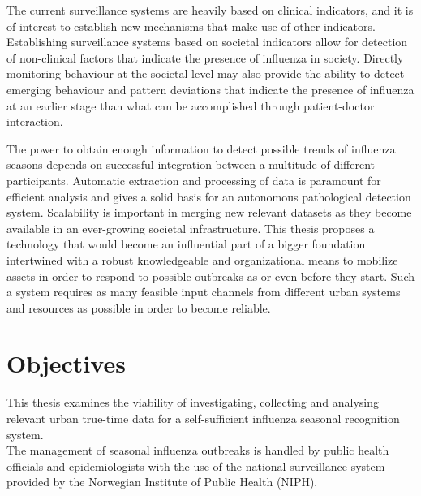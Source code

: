 The current surveillance systems are heavily based on clinical indicators, and it is of interest to establish new mechanisms that make use of other indicators. Establishing surveillance systems based on societal indicators allow for detection of non-clinical factors that indicate the presence of influenza in society. Directly monitoring behaviour at the societal level may also provide the ability to detect emerging behaviour and pattern deviations that indicate the presence of influenza at an earlier stage than what can be accomplished through patient-doctor interaction.

 The power to obtain enough information to detect possible trends of influenza seasons depends on successful integration between a multitude of different participants. Automatic extraction and processing of data is paramount for efficient analysis and gives a solid basis for an autonomous pathological detection system. Scalability is important in merging new relevant datasets as they become available in an ever-growing societal infrastructure. This thesis proposes a technology that would become an influential part of a bigger foundation intertwined with a robust knowledgeable and organizational means to mobilize assets in order to respond to possible outbreaks as or even before they start. Such a system requires as many feasible input channels from different urban systems and resources as possible in order to become reliable.

\section{Objectives}
This thesis examines the viability of investigating, collecting and analysing relevant urban true-time data for a self-sufficient influenza seasonal recognition system.
\\
The management of seasonal influenza outbreaks is handled by public health officials and epidemiologists with the use of the national surveillance system provided by the Norwegian Institute of Public Health (NIPH)\cite{niph}.
  
